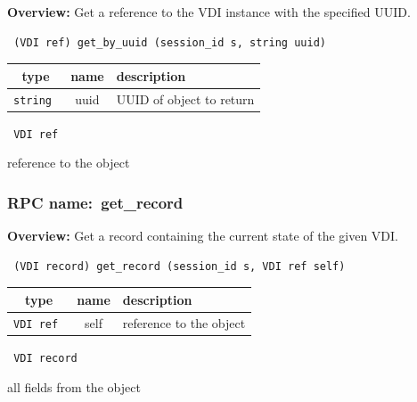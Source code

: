 {\bf Overview:} 
Get a reference to the VDI instance with the specified UUID.

\begin{verbatim} (VDI ref) get_by_uuid (session_id s, string uuid)\end{verbatim}



 
\vspace{0.3cm}
\begin{tabular}{|c|c|p{7cm}|}
 \hline
{\bf type} & {\bf name} & {\bf description} \\ \hline
{\tt string } & uuid & UUID of object to return \\ \hline 

\end{tabular}

\vspace{0.3cm}

{\tt 
VDI ref
}


reference to the object
\vspace{0.3cm}
\vspace{0.3cm}
\vspace{0.3cm}
\subsubsection{RPC name:~get\_record}

{\bf Overview:} 
Get a record containing the current state of the given VDI.

\begin{verbatim} (VDI record) get_record (session_id s, VDI ref self)\end{verbatim}



 
\vspace{0.3cm}
\begin{tabular}{|c|c|p{7cm}|}
 \hline
{\bf type} & {\bf name} & {\bf description} \\ \hline
{\tt VDI ref } & self & reference to the object \\ \hline 

\end{tabular}

\vspace{0.3cm}

{\tt 
VDI record
}


all fields from the object
\vspace{0.3cm}
\vspace{0.3cm}
\vspace{0.3cm}

